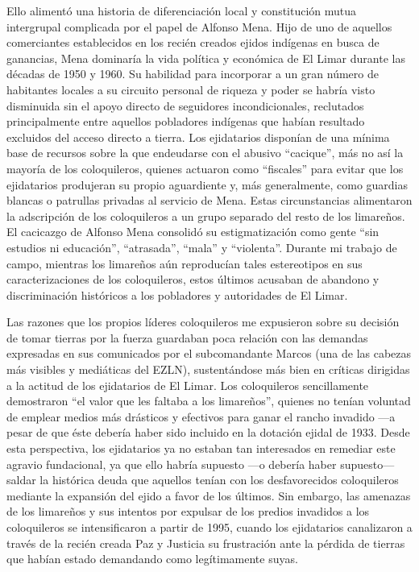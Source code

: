 \documentclass[
  spanish,
  11pt,
  a4paper,
]{scrbook}
\begin{document}
Ello alimentó una historia de diferenciación local y constitución mutua
intergrupal complicada por el papel de Alfonso Mena. Hijo de uno de
aquellos comerciantes establecidos en los recién creados ejidos
indígenas en busca de ganancias, Mena dominaría la vida política y
económica de El Limar durante las décadas de 1950 y 1960. Su habilidad
para incorporar a un gran número de habitantes locales a su circuito
personal de riqueza y poder se habría visto disminuida sin el apoyo
directo de seguidores incondicionales, reclutados principalmente entre
aquellos pobladores indígenas que habían resultado excluidos del acceso
directo a tierra. Los ejidatarios disponían de una mínima base de
recursos sobre la que endeudarse con el abusivo ``cacique'', más no así
la mayoría de los coloquileros, quienes actuaron como ``fiscales'' para
evitar que los ejidatarios produjeran su propio aguardiente y, más
generalmente, como guardias blancas o patrullas privadas al servicio de
Mena. Estas circunstancias alimentaron la adscripción de los
coloquileros a un grupo separado del resto de los limareños. El
cacicazgo de Alfonso Mena consolidó su estigmatización como gente ``sin
estudios ni educación'', ``atrasada'', ``mala'' y ``violenta''. Durante
mi trabajo de campo, mientras los limareños aún reproducían tales
estereotipos en sus caracterizaciones de los coloquileros, estos últimos
acusaban de abandono y discriminación históricos a los pobladores y
autoridades de El Limar.

Las razones que los propios líderes coloquileros me expusieron sobre su
decisión de tomar tierras por la fuerza guardaban poca relación con las
demandas expresadas en sus comunicados por el subcomandante Marcos (una
de las cabezas más visibles y mediáticas del EZLN), sustentándose más
bien en críticas dirigidas a la actitud de los ejidatarios de El Limar.
Los coloquileros sencillamente demostraron ``el valor que les faltaba a
los limareños'', quienes no tenían voluntad de emplear medios más
drásticos y efectivos para ganar el rancho invadido ---a pesar de que
éste debería haber sido incluido en la dotación ejidal de 1933. Desde
esta perspectiva, los ejidatarios ya no estaban tan interesados en
remediar este agravio fundacional, ya que ello habría supuesto ---o
debería haber supuesto--- saldar la histórica deuda que aquellos tenían
con los desfavorecidos coloquileros mediante la expansión del ejido a
favor de los últimos. Sin embargo, las amenazas de los limareños y sus
intentos por expulsar de los predios invadidos a los coloquileros se
intensificaron a partir de 1995, cuando los ejidatarios canalizaron a
través de la recién creada Paz y Justicia su frustración ante la pérdida
de tierras que habían estado demandando como legítimamente suyas.
\end{document}
